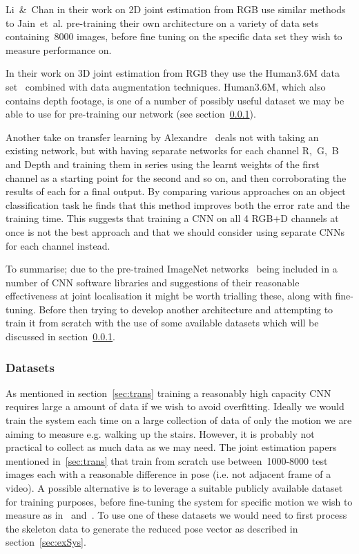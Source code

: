 \documentclass[11pt]{article} %
\begin{document}
Li~\&~Chan in their work on 2D joint estimation from RGB\cite{Li2014} use similar methods to Jain~et~al. pre-training their own architecture on a variety of data sets containing~8000 images, before fine tuning on the specific data set they wish to measure performance on.

In their work on 3D joint estimation from RGB\cite{Accv2014} they use the Human3.6M data set~\cite{Ionescu2014} combined with data augmentation techniques. Human3.6M, which also contains depth footage, is one of a number of possibly useful dataset we may be able to use for pre-training our network (see section~\ref{sec:datasets}).

Another take on transfer learning by Alexandre~\cite{Alexandre2013} deals not with taking an existing network, but with having separate networks for each channel R,~G,~B and Depth and training them in series using the learnt weights of the first channel as a starting point for the second and so on, and then corroborating the results of each for a final output. By comparing various approaches on an object classification task he finds that this method improves both the error rate and the training time. This suggests that training a CNN on all 4 RGB+D channels at once is not the best approach and that we should consider using separate CNNs for each channel instead.

To summarise; due to the pre-trained ImageNet networks~\cite{Sermanet2013b,Krizhevsky2012} being included in a number of CNN software libraries and suggestions of their reasonable effectiveness at joint localisation it might be worth trialling these, along with fine-tuning. Before then trying to develop another architecture and attempting to train it from scratch with the use of some available datasets which will be discussed in section~\ref{sec:datasets}.


\label{sec:trans}

\subsubsection{Datasets}
\label{sec:datasets}

As mentioned in section~\ref{sec:trans} training a reasonably high capacity CNN requires large a amount of data if we wish to avoid overfitting. Ideally we would train the system each time on a large collection of data of only the motion we are aiming to measure e.g. walking up the stairs. However, it is probably not practical to collect as much data as we may need. The joint estimation papers mentioned in~\ref{sec:trans} that train from scratch use between~1000-8000 test images each with a reasonable difference in pose (i.e. not adjacent frame of a video). A possible alternative is to leverage a suitable publicly available dataset for training purposes, before fine-tuning the system for specific motion we wish to measure as in~\cite{Li2014} and~\cite{Girshick2014}. To use one of these datasets we would need to first process the skeleton data to generate the reduced pose vector as described in section~\ref{sec:exSys}.
\end{document}
